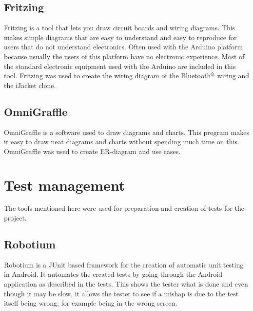 \subsection{Fritzing}
Fritzing is a tool that lets you draw circuit boards and wiring diagrams. This makes simple diagrams that are easy to understand and easy to reproduce for users that do not understand electronics. Often used with the Arduino platform because usually the users of this platform have no electronic experience. Most of the standard electronic equipment used with the Arduino are included in this tool. Fritzing was used to create the wiring diagram of the Bluetooth$\textsuperscript{\textregistered}$ wiring and the iJacket clone.

\subsection{OmniGraffle}
OmniGraffle is a software used to draw diagrams and charts. This program makes it easy to draw neat diagrams and charts without spending much time on this. OmniGraffle was used to create ER-diagram and use cases.

\section{Test management}
The tools mentioned here were used for preparation and creation of tests for the project.

\subsection{Robotium}
Robotium is a JUnit based framework for the creation of automatic unit testing in Android. It automates the created tests by going through the Android application as described in the tests. This shows the tester what is done and even though it may be slow, it allows the tester to see if a mishap is due to the test itself being wrong, for example being in the wrong screen.
